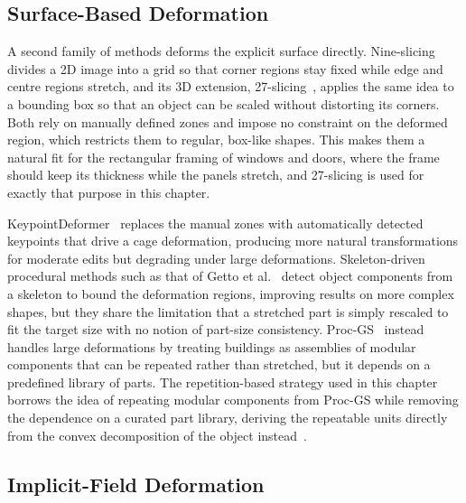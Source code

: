 \subsection{Surface-Based Deformation}
\label{sec:8_rw_surface}

A second family of methods deforms the explicit surface directly. Nine-slicing~\cite{w3_css-backgrounds-3border-image-slice_2024} divides a 2D image into a grid so that corner regions stay fixed while edge and centre regions stretch, and its 3D extension, 27-slicing~\cite{deftly_27_2021}, applies the same idea to a bounding box so that an object can be scaled without distorting its corners. Both rely on manually defined zones and impose no constraint on the deformed region, which restricts them to regular, box-like shapes. This makes them a natural fit for the rectangular framing of windows and doors, where the frame should keep its thickness while the panels stretch, and 27-slicing is used for exactly that purpose in this chapter.

KeypointDeformer~\cite{jakab_keypointdeformer_2021} replaces the manual zones with automatically detected keypoints that drive a cage deformation, producing more natural transformations for moderate edits but degrading under large deformations. Skeleton-driven procedural methods such as that of Getto et al.~\cite{getto_automatic_2020} detect object components from a skeleton to bound the deformation regions, improving results on more complex shapes, but they share the limitation that a stretched part is simply rescaled to fit the target size with no notion of part-size consistency. Proc-GS~\cite{li_proc-gs_2024} instead handles large deformations by treating buildings as assemblies of modular components that can be repeated rather than stretched, but it depends on a predefined library of parts. The repetition-based strategy used in this chapter borrows the idea of repeating modular components from Proc-GS while removing the dependence on a curated part library, deriving the repeatable units directly from the convex decomposition of the object instead~\cite{vermandere_adaptive_2026}.


\subsection{Implicit-Field Deformation}
\label{sec:8_rw_implicit}

